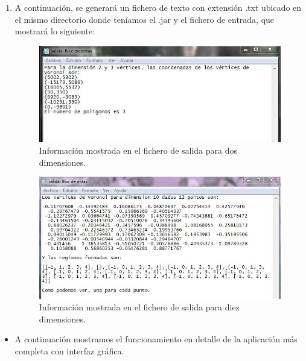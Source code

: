 \begin{enumerate}
        \item A continuación, se generará un fichero de texto con extensión .txt ubicado en el mismo directorio donde teníamos el .jar y el fichero de entrada, que mostrará lo siguiente:       
            \begin{figure}[H]
               \centering \includegraphics[scale=0.8]{imagenes/terminal2.JPG}
               \caption{Información mostrada en el fichero de salida para dos dimensiones.}
            \end{figure}
            \begin{figure}[H]
               \centering \includegraphics[scale=0.8]{imagenes/terminal13.JPG}
               \caption{Información mostrada en el fichero de salida para diez dimensiones.}
            \end{figure}
    \end{enumerate}

\begin{itemize}
    \item A continuación mostramos el funcionamiento en detalle de la aplicación más completa con interfaz gráfica.
\end{itemize}

